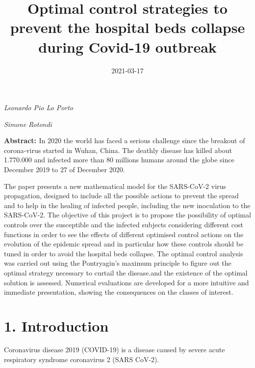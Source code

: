 \documentclass[a4paper]{article}
\title{}
\author{}
\date{2021-03-17}
\begin{document}
\title{Optimal control strategies to prevent the hospital beds collapse during Covid-19 outbreak}
\maketitle

{\centering
\textit{Leonardo Pio Lo Porto}
\par}

{\centering
\textit{Simone Rotondi }
\par}


\bigskip

\textbf{\textcolor[rgb]{0.07450981,0.078431375,0.07450981}{Abstract: }}In 2020 the world has faced a serious challenge
since the breakout of corona-virus started in Wuhan, China. The deathly disease has killed about 1.770.000 and infected
more than 80 millions humans around the globe since December 2019 to 27 of December 2020. 

The paper presents a new mathematical model for the SARS-CoV-2 virus propagation, designed to include all the possible
actions to prevent the spread and to help in the healing of infected people, including the new inoculation to the
SARS-CoV-2. The objective of this project is to propose the possibility of optimal controls over the susceptible and
the infected subjects considering different cost functions in order to see the effects of different optimised control
actions on the evolution of the epidemic spread and in particular how these controls should be tuned in order to avoid
the hospital beds collapse. \textcolor[rgb]{0.07450981,0.078431375,0.07450981}{The optimal control analysis was carried
out using the Pontryagin’s maximum principle to figure out the optimal strategy necessary to curtail the disease.}and
the existence of the optimal solution is assessed. Numerical evaluations are developed for a more intuitive and
immediate presentation, showing the consequences on the classes of interest. 


\bigskip

\setcounter{tocdepth}{6}
\renewcommand\contentsname{Indices}
\tableofcontents

\bigskip


\bigskip


\bigskip


\bigskip

\section{1. Introduction}
\hypertarget{Toc66707022}{}\textcolor[rgb]{0.07450981,0.078431375,0.07450981}{Coronavirus disease 2019 (COVID-19) is a
disease caused by severe acute respiratory syndrome coronavirus 2 (SARS CoV-2). \ }
\end{document}
